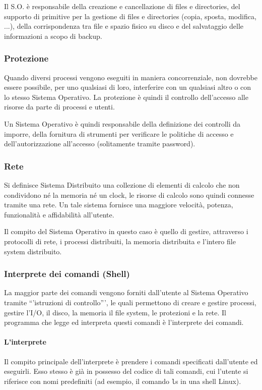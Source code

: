 \documentclass[a4paper]{article}
\begin{document}
Il S.O. è responsabile della creazione e cancellazione di files e directories, del supporto di primitive per la gestione di files e directories (copia, sposta, modifica, ...), della corrispondenza tra file e spazio fisico su disco e del salvataggio delle informazioni a scopo di backup.

\subsubsection{Protezione}
Quando diversi processi vengono eseguiti in maniera concorrenziale, non dovrebbe essere possibile, per uno qualsiasi di loro, interferire con un qualsiasi altro o con lo stesso Sistema Operativo. La protezione è quindi il controllo dell'accesso alle risorse da parte di processi e utenti.

Un Sistema Operativo è quindi responsabile della definizione dei controlli da imporre, della fornitura di strumenti per verificare le politiche di accesso e dell'autorizzazione all'accesso (solitamente tramite password).

\subsubsection{Rete}
Si definisce Sistema Distribuito una collezione di elementi di calcolo che non condividono né la memoria né un clock, le risorse di calcolo sono quindi connesse tramite una rete. Un tale sistema fornisce una maggiore velocità, potenza, funzionalità e affidabilità all'utente.

Il compito del Sistema Operativo in questo caso è quello di gestire, attraverso i protocolli di rete, i processi distribuiti, la memoria distribuita e l'intero file system distribuito.

\subsubsection{Interprete dei comandi (Shell)}
La maggior parte dei comandi vengono forniti dall'utente al Sistema Operativo tramite ``'istruzioni di controllo''', le quali permettono di creare e gestire processi, gestire l'I/O, il disco, la memoria il file system, le protezioni e la rete. Il programma che legge ed interpreta questi comandi è l'interprete dei comandi.
\paragraph{L'interprete}
Il compito principale dell'interprete è prendere i comandi specificati dall'utente ed eseguirli. Esso stesso è già in possesso del codice di tali comandi, cui l'utente si riferisce con nomi predefiniti (ad esempio, il comando \texttt ls in una shell Linux).
\end{document}
